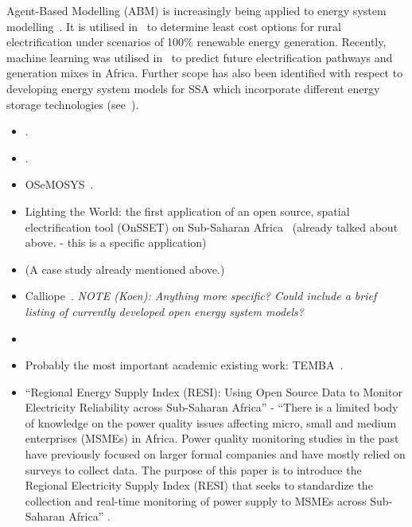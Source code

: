 \documentclass[conference, a4paper]{IEEEtran}
\begin{document}
Agent-Based Modelling (ABM) is increasingly being applied to energy system modelling~\cite{alfaro-miller-2021,riva-colombo-2020}. It is utilised in~\cite{alfaro-miller-2021} to determine least cost options for rural electrification under scenarios of 100\% renewable energy generation. Recently, machine learning was utilised in~\cite{alova-trotter-ea-2021} to predict future electrification pathways and generation mixes in Africa. Further scope has also been identified with respect to developing energy system models for SSA which incorporate different energy storage technologies (see~\cite{musonye-davidsdottir-ea-2020}).
\begin{itemize}
\item \cite{schlott-schyska-ea-2020}. 
\item \cite{phongtrakul-kongjeen-ea-2018}. 
\item OSeMOSYS~\cite{howells-rogner-ea-2011}.
\item Lighting the World: the first application of an open source, spatial electrification tool (OnSSET) on Sub-Saharan Africa~\cite{mentis-howells-ea-2017} (already talked about above. - this is a specific application)
\item \cite{menghwani-zerriffi-ea-2020} (A case study already mentioned above.)
\item Calliope~\cite{pfenninger-pickering-2018}. \emph{NOTE (Koen): Anything more specific? Could include a brief listing of currently developed open energy system models?}

\item {}

\item Probably the most important academic existing work: TEMBA~\cite{taliotis-shivakumar-ea-2016}.
\item ``Regional Energy Supply Index (RESI): Using Open Source Data to Monitor Electricity Reliability across Sub-Saharan Africa'' - ``There is a limited body of knowledge on the power quality issues affecting micro, small and medium enterprises (MSMEs) in Africa. Power quality monitoring studies in the past have previously focused on larger formal companies and have mostly relied on surveys to collect data. The purpose of this paper is to introduce the Regional Electricity Supply Index (RESI) that seeks to standardize the collection and real-time monitoring of power supply to MSMEs across Sub-Saharan Africa'' \cite{kitetu-mbutura-2020}.


\end{itemize}
\end{document}
